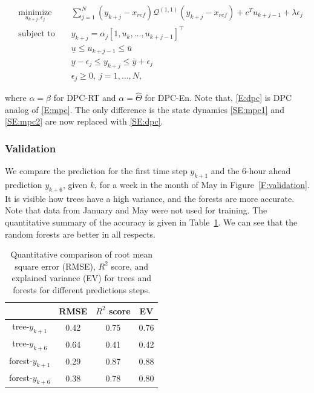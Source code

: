 \begin{subequations}
	\begin{align}
	& \underset{u_{k+j},\epsilon_j}{\text{minimize}} & & \sum_{j=1}^{N} (y_{k+j} - x_{ref}) \mathcal{Q}^{(1,1)} (y_{k+j} - x_{ref}) + c^T u_{k+j-1} + \lambda\epsilon_j \\
	& \text{subject to }                  & & y_{k+j} =  \alpha_j \left[1,u_{k},\ldots,u_{k+j-1} \right]^\top \label{SE:dpc}                                            \\
	&                                     & & \underline{u} \leq u_{k+j-1} \leq \bar{u} 									   	                                        \\
	&                                     & & \underline{y} - \epsilon_j \leq y_{k+j} \leq \bar{y} + \epsilon_j                                                         \\
	&                                     & & \epsilon_j \geq 0, \ j = 1,\dots,N,            									                 
	\end{align}\label{E:dpc}
\end{subequations} 

\noindent where $\alpha = \beta$ for DPC-RT and $\alpha = \hat{\Theta}$ for DPC-En.
Note that, \eqref{E:dpc} is DPC analog of \eqref{E:mpc}. The only difference is the state dynamics \eqref{SE:mpc1} and \eqref{SE:mpc2} are now replaced with \eqref{SE:dpc}.

\subsubsection{Validation} 
\label{SSS:dpc_val}

We compare the prediction for the first time step $y_{k+1}$ and the 6-hour ahead prediction $y_{k+6}$, given $k$, for a week in the month of May in Figure~\ref{F:validation}. It is visible how trees have a high variance, and the forests are more accurate. Note that data from January and May were not used for training. The quantitative summary of the accuracy is given in Table~\ref{T:validation}. We can see that the random forests are better in all respects.
\begin{table}[h!]
	\centering
	\begin{tabular}{cccc}
		\toprule
		                  & RMSE & $R^2$ score & EV  \\ 
		\midrule
		tree-$y_{k+1}$    & 0.42 & 0.75        & 0.76 \\
		tree-$y_{k+6}$    & 0.64 & 0.41        & 0.42 \\
		forest-$y_{k+1}$  & 0.29 & 0.87        & 0.88 \\
		forest-$y_{k+6}$  & 0.38 & 0.78        & 0.80 \\
		\bottomrule
	\end{tabular}
	\caption{Quantitative comparison of root mean square error (RMSE), $R^2$ score, and explained variance (EV) for trees and forests for different predictions steps.}
	\captionsetup{justification=centering}
	\label{T:validation}
\end{table}


